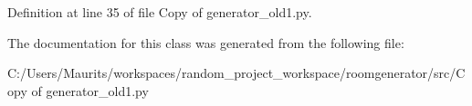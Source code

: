 Definition at line 35 of file Copy of generator\+\_\+old1.\+py.



The documentation for this class was generated from the following file\+:\begin{DoxyCompactItemize}
\item 
C\+:/\+Users/\+Maurits/workspaces/random\+\_\+project\+\_\+workspace/roomgenerator/src/Copy of generator\+\_\+old1.\+py\end{DoxyCompactItemize}
